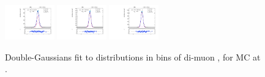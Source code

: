 \begin{figure}[htb]
\includegraphics[width=0.19\textwidth]{plots/Appendix_Recoil_Fits/ZmmMC_PF_13TeV_2G/pfu2fit_32.pdf}
\includegraphics[width=0.19\textwidth]{plots/Appendix_Recoil_Fits/ZmmMC_PF_13TeV_2G/pfu2fit_33.pdf}
\includegraphics[width=0.19\textwidth]{plots/Appendix_Recoil_Fits/ZmmMC_PF_13TeV_2G/pfu2fit_34.pdf}
\caption{Double-Gaussians fit to \uprp distributions in bins of di-muon \pt, for \zmm MC at \serah.}
\label{fig:a:recoil:fit:mc:u2:13}
\end{figure}